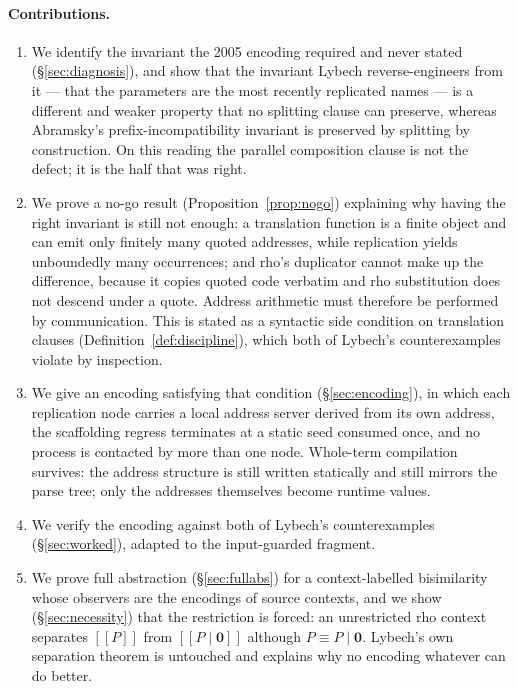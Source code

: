 \documentclass[11pt]{article}
\theoremstyle{definition}
\theoremstyle{plain}
\theoremstyle{remark}
\newcommand{\enc}[1]{[\![#1]\!]}
\newcommand{\nil}{\mathbf{0}}
\begin{document}
\paragraph{Contributions.}
\begin{enumerate}[label=(\roman*),leftmargin=2.2em]
\item We identify the invariant the 2005 encoding required and never
stated (\S\ref{sec:diagnosis}), and show that the invariant Lybech
reverse-engineers from it --- that the parameters are the most recently
replicated names --- is a different and weaker property that no splitting
clause can preserve, whereas Abramsky's prefix-incompatibility invariant
is preserved by splitting by construction. On this reading the parallel
composition clause is not the defect; it is the half that was right.
\item We prove a no-go result (Proposition~\ref{prop:nogo}) explaining why
having the right invariant is still not enough: a translation function is
a finite object and can emit only finitely many quoted addresses, while
replication yields unboundedly many occurrences; and rho's duplicator
cannot make up the difference, because it copies quoted code verbatim and
rho substitution does not descend under a quote. Address arithmetic must
therefore be performed by communication. This is stated as a syntactic
side condition on translation clauses
(Definition~\ref{def:discipline}), which both of Lybech's counterexamples
violate by inspection.
\item We give an encoding satisfying that condition
(\S\ref{sec:encoding}), in which each replication node carries a local
address server derived from its own address, the scaffolding regress
terminates at a static seed consumed once, and no process is contacted by
more than one node. Whole-term compilation survives: the address
structure is still written statically and still mirrors the parse tree;
only the addresses themselves become runtime values.
\item We verify the encoding against both of Lybech's counterexamples
(\S\ref{sec:worked}), adapted to the input-guarded fragment.
\item We prove full abstraction (\S\ref{sec:fullabs}) for a
context-labelled bisimilarity whose observers are the encodings of source
contexts, and we show (\S\ref{sec:necessity}) that the restriction is
forced: an unrestricted rho context separates $\enc{P}$ from
$\enc{P \mid \nil}$ although $P \equiv P \mid \nil$. Lybech's own
separation theorem is untouched and explains why no encoding whatever can
do better.
\end{enumerate}
\end{document}
